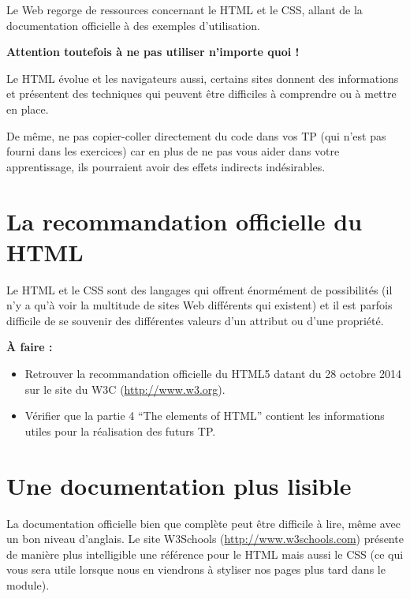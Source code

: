 \documentclass[11pt]{article}
\begin{document}
\bigskip

Le Web regorge de ressources concernant le HTML et le CSS, allant de la documentation officielle à des exemples d'utilisation.

\textbf{Attention toutefois à ne pas utiliser n'importe quoi !}

Le HTML évolue et les navigateurs aussi, certains sites donnent des informations et présentent des techniques qui peuvent être difficiles à comprendre ou à mettre en place.

De même, ne pas copier-coller directement du code dans vos TP (qui n'est pas fourni dans les exercices) car en plus de ne pas vous aider dans votre apprentissage, ils pourraient avoir des effets indirects indésirables.

\section{La recommandation officielle du HTML}

Le HTML et le CSS sont des langages qui offrent énormément de possibilités (il n'y a qu'à voir la multitude de sites Web différents qui existent) et il est parfois difficile de se souvenir des différentes valeurs d'un attribut ou d'une propriété.

\begin{afaire}
\textbf{À faire :}

\begin{itemize}
    \item Retrouver la recommandation officielle du HTML5 datant du 28 octobre 2014 sur le site du W3C (\url{http://www.w3.org}).
    \item Vérifier que la partie 4 ``The elements of HTML'' contient les informations utiles pour la réalisation des futurs TP.
\end{itemize}
\end{afaire}

\section{Une documentation plus lisible}

La documentation officielle bien que complète peut être difficile à lire, même avec un bon niveau d'anglais. Le site W3Schools (\url{http://www.w3schools.com}) présente de manière plus intelligible une référence pour le HTML mais aussi le CSS (ce qui vous sera utile lorsque nous en viendrons à styliser nos pages plus tard dans le module).
\end{document}
